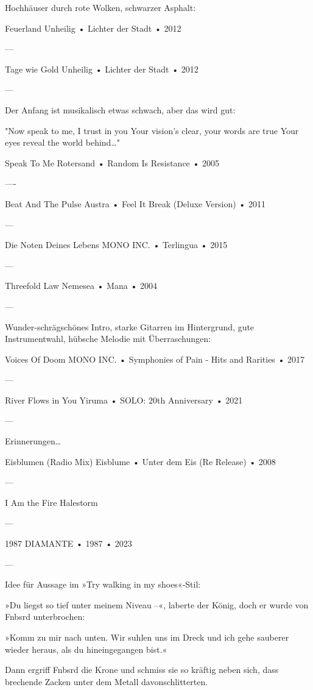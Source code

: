 Hochhäuser durch rote Wolken, schwarzer Asphalt:

Feuerland
Unheilig
 •
Lichter der Stadt
 •
2012



—

Tage wie Gold
Unheilig
 •
Lichter der Stadt
 •
2012

—

Der Anfang ist musikalisch etwas schwach, aber das wird gut:

"Now speak to me, I trust in you
Your vision's clear, your words are true
Your eyes reveal the world behind…"

Speak To Me
Rotersand
 •
Random Is Resistance
 •
2005


—-

Beat And The Pulse
Austra
 •
Feel It Break (Deluxe Version)
 •
2011


—

Die Noten Deines Lebens
MONO INC.
 •
Terlingua
 •
2015


—

Threefold Law
Nemesea
 •
Mana
 •
2004


—

Wunder-schrägschönes Intro, starke Gitarren im Hintergrund, gute Instrumentwahl, hübsche Melodie mit Überraschungen:

Voices Of Doom
MONO INC.
 •
Symphonies of Pain - Hits and Rarities
 •
2017



—

River Flows in You
Yiruma
 •
SOLO: 20th Anniversary
 •
2021


—

Erinnerungen…

Eisblumen (Radio Mix)
Eisblume
 •
Unter dem Eis (Re Release)
 •
2008


—

I Am the Fire
Halestorm


—

1987
DIAMANTE
 •
1987
 • 2023

—

Idee für Aussage im »Try walking in my shoes«-Stil:

»Du liegst so tief unter meinem Niveau –«, laberte der König, doch er wurde von Fnbsrd unterbrochen:

»Komm zu mir nach unten. Wir suhlen uns im Dreck und ich gehe sauberer wieder heraus, als du hineingegangen bist.«

Dann ergriff Fnbsrd die Krone und schmiss sie so kräftig neben sich, dass brechende Zacken unter dem Metall davonschlitterten.

